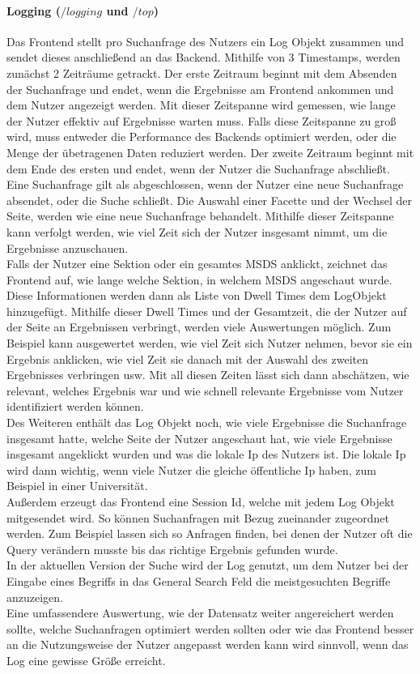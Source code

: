 \documentclass[oneside, a4paper, 12pt, titlepage]{article}
\begin{document}
\paragraph{Logging (\(/logging\) und \(/top\))}
Das Frontend stellt pro Suchanfrage des Nutzers ein Log Objekt zusammen und sendet dieses anschließend an das Backend. Mithilfe von 3 Timestamps, werden zunächst 2 Zeiträume getrackt. Der erste Zeitraum beginnt mit dem Absenden der Suchanfrage und endet, wenn die Ergebnisse am Frontend ankommen und dem Nutzer angezeigt werden. Mit dieser Zeitspanne wird gemessen, wie lange der Nutzer effektiv auf Ergebnisse warten muss. Falls diese Zeitspanne zu groß wird, muss entweder die Performance des Backends optimiert werden, oder die Menge der übetragenen Daten reduziert werden. Der zweite Zeitraum beginnt mit dem Ende des ersten und endet, wenn der Nutzer die Suchanfrage abschließt. Eine Suchanfrage gilt als abgeschlossen, wenn der Nutzer eine neue Suchanfrage absendet, oder die Suche schließt. Die Auswahl einer Facette und der Wechsel der Seite, werden wie eine neue Suchanfrage behandelt. Mithilfe dieser Zeitspanne kann verfolgt werden, wie viel Zeit sich der Nutzer insgesamt nimmt, um die Ergebnisse anzuschauen.\\
Falls der Nutzer eine Sektion oder ein gesamtes MSDS anklickt, zeichnet das Frontend auf, wie lange welche Sektion, in welchem MSDS angeschaut wurde. Diese Informationen werden dann als Liste von Dwell Times dem LogObjekt hinzugefügt. Mithilfe dieser Dwell Times und der Gesamtzeit, die der Nutzer auf der Seite an Ergebnissen verbringt, werden viele Auswertungen möglich. Zum Beispiel kann ausgewertet werden, wie viel Zeit sich Nutzer nehmen, bevor sie ein Ergebnis anklicken, wie viel Zeit sie danach mit der Auswahl des zweiten Ergebnisses verbringen usw. Mit all diesen Zeiten lässt sich dann abschätzen, wie relevant, welches Ergebnis war und wie schnell relevante Ergebnisse vom Nutzer identifiziert werden können.\\
Des Weiteren enthält das Log Objekt noch, wie viele Ergebnisse die Suchanfrage insgesamt hatte, welche Seite der Nutzer angeschaut hat, wie viele Ergebnisse insgesamt angeklickt wurden und was die lokale Ip des Nutzers ist. Die lokale Ip wird dann wichtig, wenn viele Nutzer die gleiche öffentliche Ip haben, zum Beispiel in einer Universität.\\
Außerdem erzeugt das Frontend eine Session Id, welche mit jedem Log Objekt mitgesendet wird. So können Suchanfragen mit Bezug zueinander zugeordnet werden. Zum Beispiel lassen sich so Anfragen finden, bei denen der Nutzer oft die Query verändern musste bis das richtige Ergebnis gefunden wurde.\\
In der aktuellen Version der Suche wird der Log genutzt, um dem Nutzer bei der Eingabe eines Begriffs in das General Search Feld die meistgesuchten Begriffe anzuzeigen.\\
Eine umfassendere Auswertung, wie der Datensatz weiter angereichert werden sollte, welche Suchanfragen optimiert werden sollten oder wie das Frontend besser an die Nutzungsweise der Nutzer angepasst werden kann wird sinnvoll, wenn das Log eine gewisse Größe erreicht.
\end{document}
